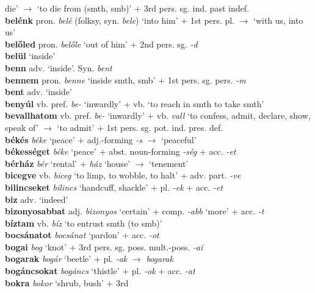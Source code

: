 \documentclass[11pt]{article}
\begin{document}
die' $\rightarrow$ `to die from (smth, smb)' + 3rd pers. sg. ind. past
indef. \\
\textbf{belénk} pron. \emph{belé} (folksy, syn. \emph{bele}) `into him' + 1st
pers. pl. $\rightarrow$ `with us, into us' \\
\textbf{belőled} pron. \emph{belőle} `out of him' + 2nd
pers. sg. \emph{-d} \\
\textbf{belül} `inside' \\
\textbf{benn} adv. `inside'. Syn. \emph{bent} \\
\textbf{bennem} pron. \emph{benne} `inside smth, smb' + 1st
pers. sg. pers. \emph{-m} \\
\textbf{bent} adv. `inside' \\
\textbf{benyúl} vb. pref. \emph{be-} `inwardly' + vb. `to reach in
smth to take smth' \\
\textbf{bevallhatom} vb. pref. \emph{be-} `inwardly' + vb. \emph{vall} `to confess, admit, declare, show,
speak of' $\rightarrow$ `to admit' + 1st
pers. sg. pot. ind. pres. def. \\
\textbf{békés} \emph{béke} `peace' + adj.\hyp{}forming \emph{-s}
$\rightarrow$ `peaceful' \\
\textbf{békességet} \emph{béke} `peace' + abst. noun\hyp{}forming
  \emph{-ség} + acc. \emph{-et} \\
\textbf{bérház} \emph{bér} `rental' + \emph{ház} `house' $\rightarrow$
`tenement' \\
\textbf{bicegve} vb. \emph{biceg} `to limp, to wobble, to halt' +
adv. part. \emph{-ve} \\
\textbf{bilincseket} \emph{bilincs} `handcuff, shackle' +
pl. \emph{-ek} + acc. \emph{-et} \\
\textbf{biz} adv. `indeed' \\
\textbf{bizonyosabbat} adj. \emph{bizonyos} `certain' +
comp. \emph{-abb} `more' + acc. \emph{-t} \\
\textbf{bíztam} vb. \emph{bíz} `to entrust smth (to smb)' \\
\textbf{bocsánatot} \emph{bocsánat} `pardon' + acc. \emph{-ot} \\
\textbf{bogai} \emph{bog} `knot' + 3rd
pers. sg. poss. mult.\hyp{}poss. \emph{-ai} \\
\textbf{bogarak} \emph{bogár} `beetle' + pl. \emph{-ak}
  $\rightarrow$ \emph{bogarak} \\
\textbf{bogáncsokat} \emph{bogáncs} `thistle' + pl. \emph{-ok} +
acc. \emph{-at} \\
\textbf{bokra} \emph{bokor} `shrub, bush' + 3rd
\end{document}
